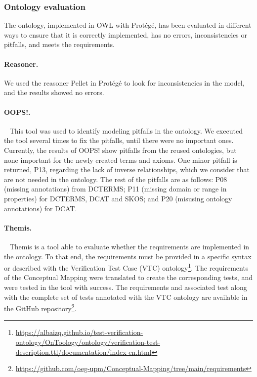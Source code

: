\subsubsection{Ontology evaluation}\label{sec:eval}


The ontology, implemented in OWL with Protégé, has been evaluated in different ways to ensure that it is correctly implemented, has no errors, inconsistencies or pitfalls, and meets the requirements.

\noindent\paragraph{\textbf{Reasoner.}} We used the reasoner Pellet in Protégé to look for inconsistencies in the model, and the results showed no errors.

\noindent\paragraph{\textbf{OOPS!.}}~\citep{poveda2014oops} This tool was used to identify modeling pitfalls in the ontology. We executed the tool several times to fix the pitfalls, until there were no important ones. Currently, the results of OOPS! show pitfalls from the reused ontologies, but none important for the newly created terms and axioms. One minor pitfall is returned, P13, regarding the lack of inverse relationships, which we consider that are not  needed in the ontology. The rest of the pitfalls are as follows: P08 (missing annotations) from DCTERMS; P11 (missing domain or range in properties) for DCTERMS, DCAT and SKOS; and P20 (misusing ontology annotations) for DCAT.

\noindent\paragraph{\textbf{Themis.}}~\citep{fernandez2021themis} Themis is a tool able to evaluate whether the requirements are implemented in the ontology. To that end, the requirements must be provided in a specific syntax or described with the Verification Test Case (VTC) ontology\footnote{\url{https://albaizq.github.io/test-verification-ontology/OnToology/ontology/verification-test-description.ttl/documentation/index-en.html}}. The requirements of the Conceptual Mapping were translated to create the corresponding tests, and were tested in the tool with success. The requirements and associated test along with the complete set of tests annotated with the VTC ontology are available in the GitHub repository\footnote{\url{https://github.com/oeg-upm/Conceptual-Mapping/tree/main/requirements}}.

